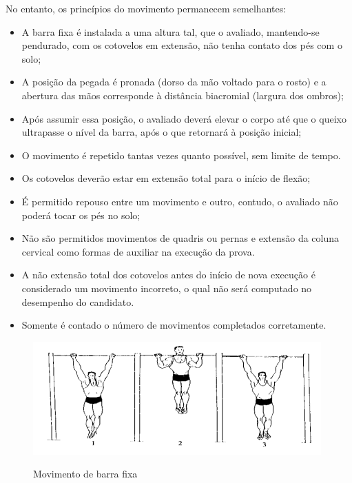 No entanto, os princípios do movimento permanecem semelhantes:

\begin{itemize}

    \item A barra fixa é instalada a uma altura tal, que o avaliado, mantendo-se pendurado, com os cotovelos em extensão, não tenha contato dos pés com o solo;

    \item A posição da pegada é pronada (dorso da mão voltado para o rosto) e a abertura das mãos corresponde à distância biacromial (largura dos ombros);

    \item Após assumir essa posição, o avaliado deverá elevar o corpo até que o queixo ultrapasse o nível da barra, após o que retornará à posição inicial;

    \item O movimento é repetido tantas vezes quanto possível, sem limite de tempo.

    \item Os cotovelos deverão estar em extensão total para o início de flexão;

    \item É permitido repouso entre um movimento e outro, contudo, o avaliado não poderá tocar os pés no solo;

    \item Não são permitidos movimentos de quadris ou pernas e extensão da coluna cervical como formas de auxiliar na execução da prova.

    \item A não extensão total dos cotovelos antes do início de nova execução é considerado um movimento incorreto, o qual não será computado no desempenho do candidato.

    \item Somente é contado o número de movimentos completados corretamente.

\end{itemize}

\begin{figure}[!htb]
	\centering
    \caption{Movimento de barra fixa}
	\includegraphics[scale=0.7]{figuras/TAF/barraFixa.jpg}
	\label{fig:Movimento de barra fixa}
\end{figure}


